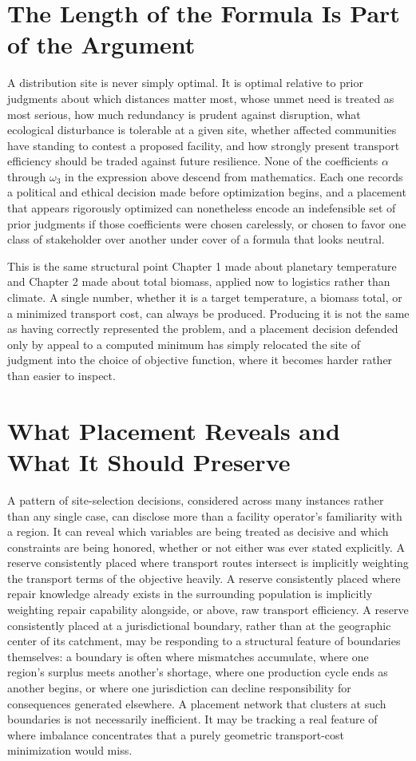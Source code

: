 \documentclass[11pt,oneside]{book}
\begin{document}
\section*{The Length of the Formula Is Part of the Argument}

A distribution site is never simply optimal. It is optimal relative to prior judgments about which distances matter most, whose unmet need is treated as most serious, how much redundancy is prudent against disruption, what ecological disturbance is tolerable at a given site, whether affected communities have standing to contest a proposed facility, and how strongly present transport efficiency should be traded against future resilience. None of the coefficients $\alpha$ through $\omega_3$ in the expression above descend from mathematics. Each one records a political and ethical decision made before optimization begins, and a placement that appears rigorously optimized can nonetheless encode an indefensible set of prior judgments if those coefficients were chosen carelessly, or chosen to favor one class of stakeholder over another under cover of a formula that looks neutral.

This is the same structural point Chapter 1 made about planetary temperature and Chapter 2 made about total biomass, applied now to logistics rather than climate. A single number, whether it is a target temperature, a biomass total, or a minimized transport cost, can always be produced. Producing it is not the same as having correctly represented the problem, and a placement decision defended only by appeal to a computed minimum has simply relocated the site of judgment into the choice of objective function, where it becomes harder rather than easier to inspect.

\section*{What Placement Reveals and What It Should Preserve}

A pattern of site-selection decisions, considered across many instances rather than any single case, can disclose more than a facility operator's familiarity with a region. It can reveal which variables are being treated as decisive and which constraints are being honored, whether or not either was ever stated explicitly. A reserve consistently placed where transport routes intersect is implicitly weighting the transport terms of the objective heavily. A reserve consistently placed where repair knowledge already exists in the surrounding population is implicitly weighting repair capability alongside, or above, raw transport efficiency. A reserve consistently placed at a jurisdictional boundary, rather than at the geographic center of its catchment, may be responding to a structural feature of boundaries themselves: a boundary is often where mismatches accumulate, where one region's surplus meets another's shortage, where one production cycle ends as another begins, or where one jurisdiction can decline responsibility for consequences generated elsewhere. A placement network that clusters at such boundaries is not necessarily inefficient. It may be tracking a real feature of where imbalance concentrates that a purely geometric transport-cost minimization would miss.
\end{document}
